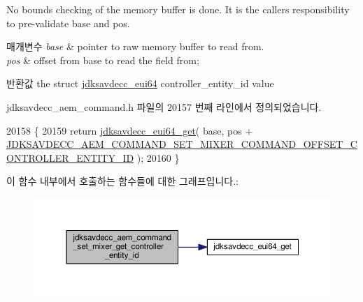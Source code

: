 No bounds checking of the memory buffer is done. It is the caller\textquotesingle{}s responsibility to pre-\/validate base and pos.


\begin{DoxyParams}{매개변수}
{\em base} & pointer to raw memory buffer to read from. \\
\hline
{\em pos} & offset from base to read the field from; \\
\hline
\end{DoxyParams}
\begin{DoxyReturn}{반환값}
the struct \hyperlink{structjdksavdecc__eui64}{jdksavdecc\+\_\+eui64} controller\+\_\+entity\+\_\+id value 
\end{DoxyReturn}


jdksavdecc\+\_\+aem\+\_\+command.\+h 파일의 20157 번째 라인에서 정의되었습니다.


\begin{DoxyCode}
20158 \{
20159     \textcolor{keywordflow}{return} \hyperlink{group__eui64_ga2652311a25a6b91cddbed75c108c7031}{jdksavdecc\_eui64\_get}( base, pos + 
      \hyperlink{group__command__set__mixer_gab8257fc8827419ae15a79a80180ed978}{JDKSAVDECC\_AEM\_COMMAND\_SET\_MIXER\_COMMAND\_OFFSET\_CONTROLLER\_ENTITY\_ID}
       );
20160 \}
\end{DoxyCode}


이 함수 내부에서 호출하는 함수들에 대한 그래프입니다.\+:
\nopagebreak
\begin{figure}[H]
\begin{center}
\leavevmode
\includegraphics[width=350pt]{group__command__set__mixer_ga79464e76f2178a35958092e4d79a9de7_cgraph}
\end{center}
\end{figure}


